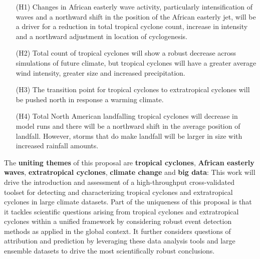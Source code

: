 \documentclass[11pt]{article}
\begin{document}
\vspace{-0.4cm}
\begin{itemize}

\item[(H1)] Changes in African easterly wave activity, particularly intensification of waves and a northward shift in the position of the African easterly jet, will be a driver for a reduction in total tropical cyclone count, increase in intensity and a northward adjustment in location of cyclogenesis.

\item[(H2)] Total count of tropical cyclones will show a robust decrease across simulations of future climate, but tropical cyclones will have a greater average wind intensity, greater size and increased precipitation.  

\item[(H3)] The transition point for tropical cyclones to extratropical cyclones will be pushed north in response a warming climate.

\item[(H4)] Total North American landfalling tropical cyclones will decrease in model runs and there will be a northward shift in the average position of landfall. However, storms that do make landfall will be larger in size with increased rainfall amounts.
\end{itemize}

The \textbf{uniting themes} of this proposal are \textbf{tropical cyclones}, \textbf{African easterly waves}, \textbf{extratropical cyclones}, \textbf{climate change} and \textbf{big data}: This work will drive the introduction and assessment of a high-throughput cross-validated toolset for detecting and characterizing tropical cyclones and extratropical cyclones in large climate datasets.  Part of the uniqueness of this proposal is that it tackles scientific questions arising from tropical cyclones and extratropical cyclones within a unified framework by considering robust event detection methods as applied in the global context.  It further considers questions of attribution and prediction by leveraging these data analysis tools and large ensemble datasets to drive the most scientifically robust conclusions.
\end{document}
